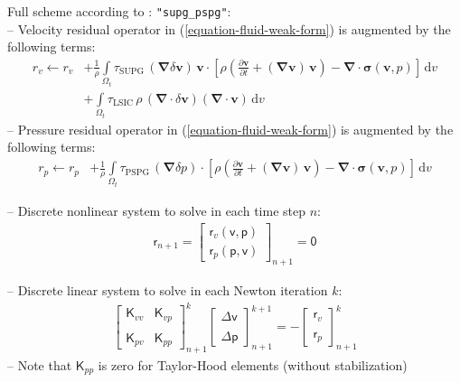 \documentclass[a4paper,12pt]{report}
\newcommand{\bs}[1]{\boldsymbol{#1}}
\newcommand{\Om}{\mathit{\Omega}}
\newcommand{\ROP}{\bs{\mathsf{r}}}
\begin{document}
Full scheme according to \cite{tezduyar2000}: \verb."supg_pspg".:\\
-- Velocity residual operator in (\ref{equation-fluid-weak-form}) is augmented by the following terms:
\begin{equation}
\begin{aligned}
r_v \leftarrow r_v &+ \frac{1}{\rho}\int\limits_{\Om_t} \tau_{\mathrm{SUPG}}\,(\bs{\nabla}\delta\bs{v})\,\bs{v} \cdot \left[\rho\left(\frac{\partial \bs{v}}{\partial t} + (\bs{\nabla}\bs{v})\,\bs{v}\right) - \bs{\nabla} \cdot \bs{\sigma}(\bs{v},p)\right]\,\mathrm{d}v \\
& + \int\limits_{\Om_t} \tau_{\mathrm{LSIC}}\,\rho\,(\bs{\nabla}\cdot\delta\bs{v})(\bs{\nabla}\cdot\bs{v})\,\mathrm{d}v
\end{aligned}
\end{equation}
-- Pressure residual operator in (\ref{equation-fluid-weak-form}) is augmented by the following terms:
\begin{equation}
\begin{aligned}
r_p \leftarrow r_p &+ \frac{1}{\rho}\int\limits_{\Om_t} \tau_{\mathrm{PSPG}}\,(\bs{\nabla}\delta p) \cdot \left[\rho\left(\frac{\partial \bs{v}}{\partial t} + (\bs{\nabla}\bs{v})\,\bs{v}\right) - \bs{\nabla} \cdot \bs{\sigma}(\bs{v},p)\right]\,\mathrm{d}v 
\end{aligned}
\end{equation}

-- Discrete nonlinear system to solve in each time step $n$:
\begin{equation}
\label{equation-nonlin-sys-fluid}
\begin{aligned}
\ROP_{n+1} = \begin{bmatrix} \ROP_{v}(\bs{\mathsf{v}},\bs{\mathsf{p}}) \\ \ROP_{p}(\bs{\mathsf{p}},\bs{\mathsf{v}}) \end{bmatrix}_{n+1} = \bs{\mathsf{0}}
\end{aligned}
\end{equation}

-- Discrete linear system to solve in each Newton iteration $k$:
\begin{equation}
\label{equation-lin-sys-fluid}
\begin{aligned}
\begin{bmatrix} \bs{\mathsf{K}}_{vv} & \bs{\mathsf{K}}_{vp} \\ \\ \bs{\mathsf{K}}_{pv} & \bs{\mathsf{K}}_{pp} \end{bmatrix}_{n+1}^{k}\begin{bmatrix} \Delta\bs{\mathsf{v}} \\ \\ \Delta\bs{\mathsf{p}} \end{bmatrix}_{n+1}^{k+1}=-\begin{bmatrix} \ROP_{v} \\ \\ \ROP_{p} \end{bmatrix}_{n+1}^{k}
\end{aligned}
\end{equation}
-- Note that $\bs{\mathsf{K}}_{pp}$ is zero for Taylor-Hood elements (without stabilization)
\end{document}
